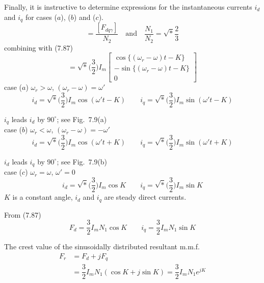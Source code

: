 \documentclass[a4paper,numbers=noenddot,12pt]{scrbook}
\begin{document}
    Finally, it is instructive to determine expressions for the instantaneous currents $i_d$ and $i_q$ for cases ($a$), ($b$) and ($c$).
    \begin{equation*}
        [i_{d q \gamma}] = \dfrac{[F_{d q \gamma}]}{N_2} \quad \text{and} \quad \dfrac{N_1}{N_2} = \sqrt*{\dfrac{2}{3}}
    \end{equation*}
    combining with (7.87)
    \begin{equation}
        [i_{d q \gamma}] = \sqrt*{\Big( \dfrac{3}{2} \Big)} I_m
        \begin{bmatrix}
            \cos \{(\omega_r - \omega)t -K\} \\
            -\sin \{(\omega_r - \omega)t -K\} \\
            0
        \end{bmatrix}
        \label{eq:Eq7.93}
    \end{equation}
    case ($a$) $\omega_r > \omega$, $(\omega_r - \omega) = \omega'$
    \begin{equation*}
        i_d = \sqrt*{\Big( \dfrac{3}{2} \Big)} I_m \cos (\omega' t - K) \qquad i_q = \sqrt*{\Big( \dfrac{3}{2} \Big)} I_m \sin (\omega' t - K)
    \end{equation*}

    $i_q$ leads $i_d$ by $90^{\circ}$; see Fig.\ 7.9(a) \\
    case ($b$) $\omega_r < \omega$, $(\omega_r - \omega) = -\omega'$
    \begin{equation*}
        i_d = \sqrt*{\Big( \dfrac{3}{2} \Big)} I_m \cos (\omega' t + K) \qquad i_q = \sqrt*{\Big( \dfrac{3}{2} \Big)} I_m \sin (\omega' t + K)
    \end{equation*}

    $i_d$ leads $i_q$ by $90^{\circ}$; see Fig.\ 7.9(b) \\
    case ($c$) $\omega_r = \omega$, $\omega' = 0$
    \begin{equation*}
        i_d = \sqrt*{\Big( \dfrac{3}{2} \Big)} I_m \cos K \qquad i_q = \sqrt*{\Big( \dfrac{3}{2} \Big)} I_m \sin K
    \end{equation*}
    $K$ is a constant angle, $i_d$ and $i_q$ are steady direct currents.

    From (7.87)
    \begin{equation*}
        F_d = \dfrac{3}{2} I_m N_1 \cos K \qquad i_q = \dfrac{3}{2} I_m N_1 \sin K
    \end{equation*}

    The crest value of the sinusoidally distributed resultant m.m.f.
    \begin{align*}
        F_r & = F_d + jF_q\\
        & = \dfrac{3}{2} I_m N_1 (\cos K + j \sin K) = \dfrac{3}{2} I_m N_1 e^{jK}
    \end{align*}
\end{document}
